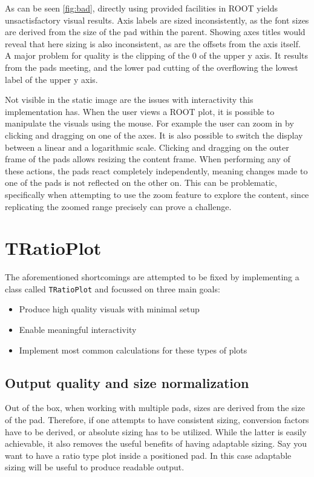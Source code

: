 As can be seen \autoref{fig:bad}, directly using provided facilities in ROOT yields
unsactisfactory visual results. Axis labels are sized inconsistently, as the font sizes
are derived from the size of the pad within the parent. Showing axes titles would reveal
that here sizing is also inconsistent, as are the offsets from the axis itself. A major
problem for quality is the clipping of the 0 of the upper y axis. It results from the pads meeting,
and the lower pad cutting of the overflowing the lowest label of the upper y axis.

Not visible in the static image are the issues with interactivity this implementation has. When the user
views a ROOT plot, it is possible to manipulate the visuals using the mouse. For example 
the user can zoom in by clicking and dragging on one of the axes. It is also possible to switch
the display between a linear and a logarithmic scale. Clicking and dragging on the outer frame of the 
pads allows resizing the content frame. When performing any of these actions, the pads
react completely independently, meaning changes made to one of the pads is not reflected
on the other on. This can be problematic, specifically when attempting to use the zoom
feature to explore the content, since replicating the zoomed range precisely can prove a challenge.

\section{TRatioPlot}

The aforementioned shortcomings are attempted to be fixed by implementing a class called \texttt{TRatioPlot} and focussed on three main goals:

\begin{itemize}
  \item Produce high quality visuals with minimal setup
  \item Enable meaningful interactivity
  \item Implement most common calculations for these types of plots
\end{itemize}

\subsection{Output quality and size normalization}
Out of the box, when working with multiple pads, sizes are derived from the size of the pad. Therefore, if one
attempts to have consistent sizing, conversion factors have to be derived, or absolute sizing has to be utilized. While the latter is easily achievable, it also removes the useful benefits of having adaptable sizing. Say
you want to have a ratio type plot inside a positioned pad. In this case adaptable sizing will be useful to
produce readable output.

